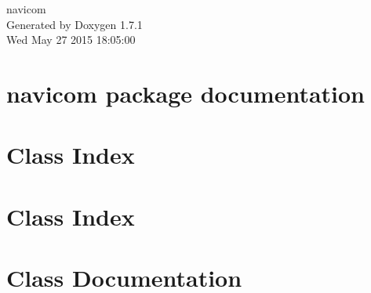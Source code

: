 \documentclass[a4paper]{article}
\begin{document}
\hypersetup{pageanchor=false}
\begin{titlepage}
\vspace*{7cm}
\begin{center}
{\Large navicom }\\
\vspace*{1cm}
{\large Generated by Doxygen 1.7.1}\\
\vspace*{0.5cm}
{\small Wed May 27 2015 18:05:00}\\
\end{center}
\end{titlepage}
\tableofcontents
{}
\hypersetup{pageanchor=true}
\section{navicom package documentation}
\label{index}\hypertarget{index}{}
\section{Class Index}

\section{Class Index}

\section{Class Documentation}





\printindex
\end{document}
